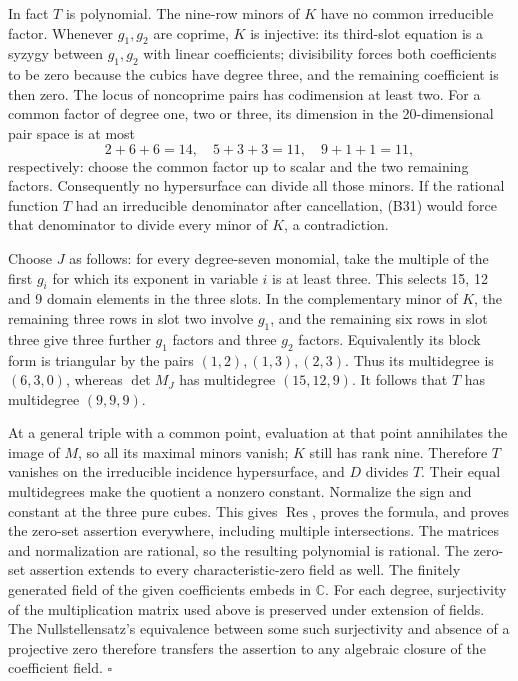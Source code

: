 \documentclass[
]{article}
\begin{document}
In fact \(T\) is polynomial. The nine-row minors of \(K\) have no common
irreducible factor. Whenever \(g_1,g_2\) are coprime, \(K\) is
injective: its third-slot equation is a syzygy between \(g_1,g_2\) with
linear coefficients; divisibility forces both coefficients to be zero
because the cubics have degree three, and the remaining coefficient is
then zero. The locus of noncoprime pairs has codimension at least two.
For a common factor of degree one, two or three, its dimension in the
20-dimensional pair space is at most \[
2+6+6=14,\quad 5+3+3=11,\quad 9+1+1=11,
\] respectively: choose the common factor up to scalar and the two
remaining factors. Consequently no hypersurface can divide all those
minors. If the rational function \(T\) had an irreducible denominator
after cancellation, (B31) would force that denominator to divide every
minor of \(K\), a contradiction.

Choose \(J\) as follows: for every degree-seven monomial, take the
multiple of the first \(g_i\) for which its exponent in variable \(i\)
is at least three. This selects 15, 12 and 9 domain elements in the
three slots. In the complementary minor of \(K\), the remaining three
rows in slot two involve \(g_1\), and the remaining six rows in slot
three give three further \(g_1\) factors and three \(g_2\) factors.
Equivalently its block form is triangular by the pairs
\((1,2),(1,3),(2,3)\). Thus its multidegree is \((6,3,0)\), whereas
\(\det M_J\) has multidegree \((15,12,9)\). It follows that \(T\) has
multidegree \((9,9,9)\).

At a general triple with a common point, evaluation at that point
annihilates the image of \(M\), so all its maximal minors vanish; \(K\)
still has rank nine. Therefore \(T\) vanishes on the irreducible
incidence hypersurface, and \(D\) divides \(T\). Their equal
multidegrees make the quotient a nonzero constant. Normalize the sign
and constant at the three pure cubes. This gives \(\operatorname{Res}\),
proves the formula, and proves the zero-set assertion everywhere,
including multiple intersections. The matrices and normalization are
rational, so the resulting polynomial is rational. The zero-set
assertion extends to every characteristic-zero field as well. The
finitely generated field of the given coefficients embeds in
\(\mathbb C\). For each degree, surjectivity of the multiplication
matrix used above is preserved under extension of fields. The
Nullstellensatz's equivalence between some such surjectivity and absence
of a projective zero therefore transfers the assertion to any algebraic
closure of the coefficient field. \(\square\)
\end{document}
